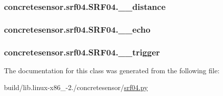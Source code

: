 \subsubsection[{\+\_\+\+\_\+distance}]{\setlength{\rightskip}{0pt plus 5cm}concretesensor.\+srf04.\+S\+R\+F04.\+\_\+\+\_\+distance\hspace{0.3cm}{\ttfamily [private]}}\label{classconcretesensor_1_1srf04_1_1SRF04_a20024100a31377933b15b5af99123b11}
\hypertarget{classconcretesensor_1_1srf04_1_1SRF04_a5b76d7e0ecac244d96515dbe5f6fd099}{}
\subsubsection[{\+\_\+\+\_\+echo}]{\setlength{\rightskip}{0pt plus 5cm}concretesensor.\+srf04.\+S\+R\+F04.\+\_\+\+\_\+echo\hspace{0.3cm}{\ttfamily [private]}}\label{classconcretesensor_1_1srf04_1_1SRF04_a5b76d7e0ecac244d96515dbe5f6fd099}
\hypertarget{classconcretesensor_1_1srf04_1_1SRF04_a33b763eddf880935842bec7700cc4e9d}{}
\subsubsection[{\+\_\+\+\_\+trigger}]{\setlength{\rightskip}{0pt plus 5cm}concretesensor.\+srf04.\+S\+R\+F04.\+\_\+\+\_\+trigger\hspace{0.3cm}{\ttfamily [private]}}\label{classconcretesensor_1_1srf04_1_1SRF04_a33b763eddf880935842bec7700cc4e9d}


The documentation for this class was generated from the following file\+:\begin{DoxyCompactItemize}
\item 
build/lib.\+linux-\/x86\+\_-\/2./concretesensor/\hyperlink{build_2lib_8linux-x86__64-2_87_2concretesensor_2srf04_8py}{srf04.\+py}\end{DoxyCompactItemize}

